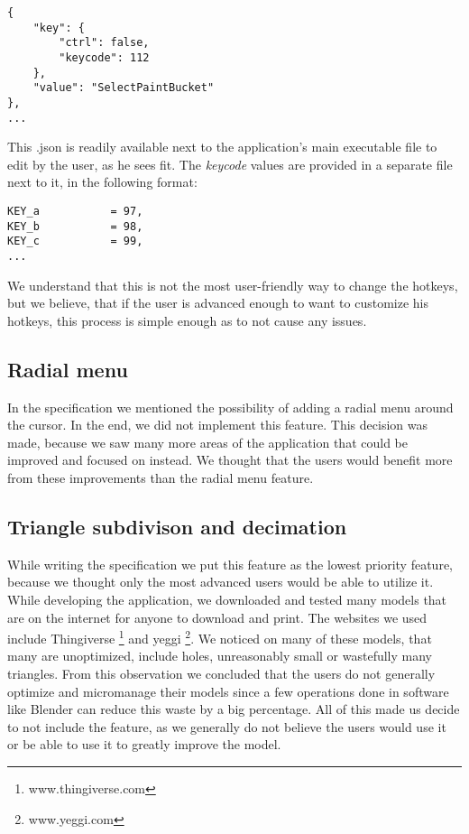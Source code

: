 \begin{lstlisting}
{
    "key": {
        "ctrl": false,
        "keycode": 112
    },
    "value": "SelectPaintBucket"
},
...
\end{lstlisting}

This .json is readily available next to the application's main executable file to edit by the user, as he sees fit. The \textit{keycode} values are provided in a separate file next to it, in the following format:

\begin{lstlisting}
KEY_a			= 97,
KEY_b			= 98,
KEY_c			= 99,
...
\end{lstlisting}

We understand that this is not the most user-friendly way to change the hotkeys, but we believe, that if the user is advanced enough to want to customize his hotkeys, this process is simple enough as to not cause any issues.

\subsection{Radial menu}

In the specification we mentioned the possibility of adding a radial menu around the cursor. In the end, we did not implement this feature. This decision was made, because we saw many more areas of the application that could be improved and focused on instead. We thought that the users would benefit more from these improvements than the radial menu feature.

\subsection{Triangle subdivison and decimation}

While writing the specification we put this feature as the lowest priority feature, because we thought only the most advanced users would be able to utilize it. While developing the application, we downloaded and tested many models that are on the internet for anyone to download and print. The websites we used include Thingiverse \footnote{www.thingiverse.com} and yeggi \footnote{www.yeggi.com}. We noticed on many of these models, that many are unoptimized, include holes, unreasonably small or wastefully many triangles. From this observation we concluded that the users do not generally optimize and micromanage their models since a few operations done in software like Blender can reduce this waste by a big percentage. All of this made us decide to not include the feature, as we generally do not believe the users would use it or be able to use it to greatly improve the model.

